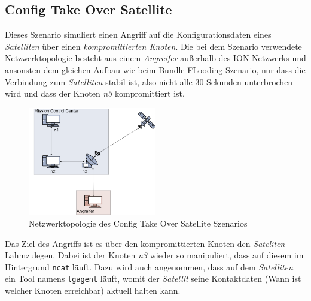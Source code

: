 \documentclass{article}
\begin{document}
\subsection{Config Take Over Satellite}
Dieses Szenario simuliert einen Angriff auf die Konfigurationsdaten eines \textit{Satelliten} über einen \textit{kompromittierten Knoten}. Die bei dem Szenario verwendete Netzwerktopologie besteht aus einem \textit{Angreifer} außerhalb des ION-Netzwerks und ansonsten dem gleichen Aufbau wie beim Bundle FLooding Szenario, nur dass die Verbindung zum \textit{Satelliten} stabil ist, also nicht alle 30 Sekunden unterbrochen wird und dass der Knoten \textit{n3} kompromittiert ist.
\par
\begin{figure}[h]
\centering
\includegraphics[width=0.5\textwidth]{ctos}
\caption{Netzwerktopologie des Config Take Over Satellite Szenarios}
\end{figure}
Das Ziel des Angriffs ist es über den kompromittierten Knoten den \textit{Sateliten} Lahmzulegen.
Dabei ist der Knoten \textit{n3} wieder so manipuliert, dass auf diesem im Hintergrund \texttt{ncat} läuft. Dazu wird auch angenommen, dass auf dem \textit{Satelliten} ein Tool namens \texttt{lgagent} läuft, womit der \textit{Satellit} seine Kontaktdaten (Wann ist welcher Knoten erreichbar) aktuell halten kann.
\end{document}
